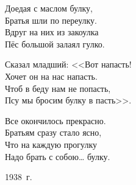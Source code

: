 \begin{center}
\begin{minipage}{0.7\textwidth}
\raggedright
\hspace*{1em} Доедая с маслом булку,\\
\hspace*{1em} Братья шли по переулку.\\
\hspace*{1em} Вдруг на них из закоулка\\
\hspace*{1em} Пёс большой залаял гулко.

\medskip
\hspace*{3em} Сказал младший: <<Вот напасть!\\
\hspace*{3em} Хочет он на нас напасть.\\
\hspace*{3em} Чтоб в беду нам не попасть,\\
\hspace*{3em} Псу мы бросим булку в пасть>>.

\medskip
\hspace*{1em} Все окончилось прекрасно.\\
\hspace*{1em} Братьям сразу стало ясно,\\
\hspace*{1em} Что на каждую прогулку\\
\hspace*{1em} Надо брать с собою\dots{} булку.
\end{minipage}
\end{center}

\begin{flushright}
1938~г.
\end{flushright}
